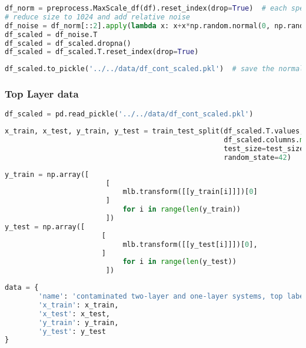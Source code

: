 \begin{lstlisting}[language=Python]
df_norm = preprocess.MaxScale_df(df).reset_index(drop=True)  # each spectrum is scaled to 1
# reduce size to 1024 and add relative noise
df_noise = df_norm[::2].apply(lambda x: x+x*np.random.normal(0, np.random.randint(1,3)*0.01 , len(x)))
df_scaled = df_noise.T
df_scaled = df_scaled.dropna()
df_scaled = df_scaled.T.reset_index(drop=True)
\end{lstlisting}

\begin{lstlisting}[language=Python]
df_scaled.to_pickle('../../data/df_cont_scaled.pkl')  # save the normalized, scaled df
\end{lstlisting}

\hypertarget{top-layer-data-1}{%
\subsubsection{Top Layer data}\label{top-layer-data-1}}

\begin{lstlisting}[language=Python]
df_scaled = pd.read_pickle('../../data/df_cont_scaled.pkl')
\end{lstlisting}

\begin{lstlisting}[language=Python]
x_train, x_test, y_train, y_test = train_test_split(df_scaled.T.values,
                                                    df_scaled.columns.map(lambda x: x.split('_')[0]), # first part of the filename is the top label
                                                    test_size=test_size_ratio,
                                                    random_state=42)
\end{lstlisting}

\begin{lstlisting}[language=Python]
y_train = np.array([    
                        [
                            mlb.transform([[y_train[i]]])[0]
                        ] 
                            for i in range(len(y_train))
                        ])
y_test = np.array([ 
                       [
                            mlb.transform([[y_test[i]]])[0],
                       ] 
                            for i in range(len(y_test))
                        ])
\end{lstlisting}

\begin{lstlisting}[language=Python]
data = {
        'name': 'contaminated two-layer and one-layer systems, top labels',
        'x_train': x_train,
        'x_test': x_test,
        'y_train': y_train,
        'y_test': y_test
}
\end{lstlisting}

